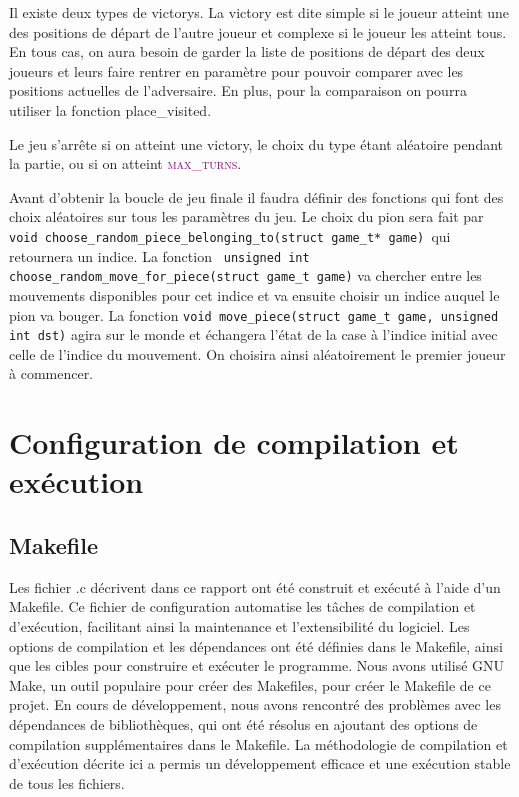 \documentclass[a4paper]{article}
\begin{document}
Il existe deux types de victorys. La victory est dite simple si le joueur atteint une des positions de départ de l’autre joueur
 et complexe si le joueur les atteint tous. En tous cas, on aura besoin de garder la liste de positions de départ des deux joueurs 
 et leurs faire rentrer en paramètre pour pouvoir comparer avec les positions actuelles de l’adversaire. En plus, pour la comparaison on 
 pourra utiliser la fonction place\_visited. 

Le jeu s’arrête si on atteint une victory, le choix du type étant aléatoire pendant la partie, ou si on atteint \textcolor{purple}{\textsc{max\_turns}}. 

Avant d’obtenir la boucle de jeu finale il faudra définir des fonctions qui font des choix aléatoires sur tous les paramètres du jeu. 
Le choix du pion sera fait par \lstinline|void choose_random_piece_belonging_to(struct game_t* game) |qui retournera un indice. La fonction \lstinline| unsigned int choose_random_move_for_piece(struct game_t game)| va chercher entre les mouvements disponibles pour cet indice et va ensuite choisir un indice auquel le pion va bouger. La fonction \lstinline|void move_piece(struct game_t game, unsigned int dst)| agira sur le monde et échangera l’état de la case à l’indice initial avec celle de l’indice du mouvement. On choisira ainsi aléatoirement le premier joueur à commencer. 



\section{Configuration de compilation et exécution}
\subsection{Makefile}


Les fichier .c décrivent dans ce rapport ont été construit et exécuté à l'aide d'un Makefile. Ce fichier de configuration automatise les tâches de compilation et d'exécution, facilitant ainsi la maintenance et l'extensibilité du logiciel. Les options de compilation et les dépendances ont été définies dans le Makefile, ainsi que les cibles pour construire et exécuter le programme. Nous avons utilisé GNU Make, un outil populaire pour créer des Makefiles, pour créer le Makefile de ce projet. En cours de développement, nous avons rencontré des problèmes avec les dépendances de bibliothèques, qui ont été résolus en ajoutant des options de compilation supplémentaires dans le Makefile. La méthodologie de compilation et d'exécution décrite ici a permis un développement efficace et une exécution stable de tous les fichiers.
\end{document}
